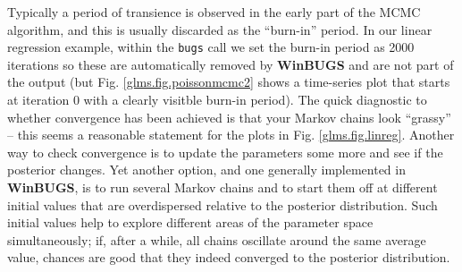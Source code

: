 Typically a period of transience is observed in the
early part of the MCMC algorithm, and this is usually discarded as the
``burn-in'' period. In our linear regression example, within the {\tt bugs} call we set the burn-in period as 2000 iterations so these are automatically removed by {\bf WinBUGS} and are not part of the output (but Fig. \ref{glms.fig.poissonmcmc2} shows a time-series plot that starts at iteration 0 with a clearly visitble burn-in period). The quick diagnostic to whether convergence has
been achieved is that your Markov chains look ``grassy'' -- this seems a reasonable statement for the plots in Fig. \ref{glms.fig.linreg}.  Another way to check convergence is to
update the parameters some more and see if the posterior changes. Yet
another option, and one generally implemented in {\bf WinBUGS}, is to
run several Markov chains and to start them off at different initial
values that are overdispersed relative to the posterior
distribution. Such initial values help to explore different areas of
the parameter space simultaneously; if, after a while, all chains
oscillate around the same average value, chances are good that they
indeed converged to the posterior distribution.

